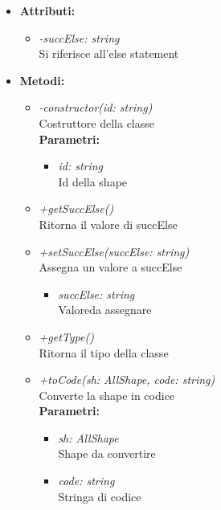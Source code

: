 \begin{itemize}
	\item \textbf{Attributi:}
		\begin{itemize}
			\item \emph{-succElse: string}\\
			Si riferisce all'else statement
		\end{itemize}
	\item \textbf{Metodi:}
		\begin{itemize}
			\item \emph{-constructor(id: string)}\\
    		Costruttore della classe\\
    		\textbf{Parametri:}
    		\begin{itemize}
    			\item \emph{id: string}\\
    			Id della shape
    		\end{itemize}
    		\item \emph{+getSuccElse()}\\
    		Ritorna il valore di succElse
    		\item \emph{+setSuccElse(succElse: string)}\\
    		Assegna un valore a succElse\\
    		\begin{itemize}
    			\item \emph{succElse: string}\\
    			Valoreda assegnare
    		\end{itemize}
    		\item \emph{+getType()}\\
    		Ritorna il tipo della classe
    		\item \emph{+toCode(sh: AllShape, code: string)}\\
    		Converte la shape in codice\\
    		\textbf{Parametri:}
    		\begin{itemize}
    			\item \emph{sh: AllShape}\\
    			Shape da convertire
    			\item \emph{code: string}\\
    			Stringa di codice
    		\end{itemize}
    	\end{itemize}
\end{itemize}